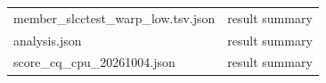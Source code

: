 \begin{longtable}{>{\raggedright\arraybackslash}p{.49\linewidth}>{\raggedright\arraybackslash}p{.44\linewidth}}
member\_\allowbreak{}slcctest\_\allowbreak{}warp\_\allowbreak{}low.tsv.json & %
result summary \\ %

analysis.json & %
result summary \\ %

score\_\allowbreak{}cq\_\allowbreak{}cpu\_\allowbreak{}20261004.json & %
result summary \\ %

\end{longtable}
\endgroup
